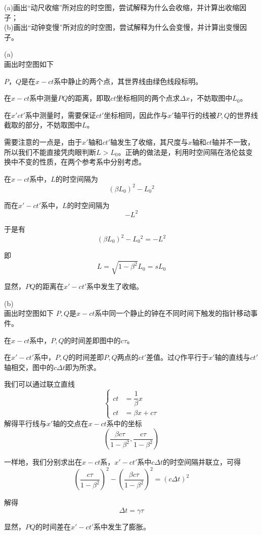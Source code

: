 \begin{ex}
(a)画出“动尺收缩”所对应的时空图，尝试解释为什么会收缩，并计算出收缩因子；
\\(b)画出“动钟变慢”所对应的时空图，尝试解释为什么会变慢，并计算出变慢因子。    
\end{ex}
\begin{so} 
    (a)\\
    画出时空图如下
    
    $P$，$Q$是在$x-ct$系中静止的两个点，其世界线由绿色线段标明。
    
    在$x-ct$系中测量$PQ$的距离，即取$ct$坐标相同的两个点求$\Delta x$，不妨取图中$L_0$。
    
    在$x'ct'$系中测量时，需要保证$ct'$坐标相同，因此作与$x'$轴平行的线被$P,Q$的世界线截取的部分，不妨取图中$L$。
    
    需要注意的一点是，由于$x'$轴和$ct'$轴发生了收缩，其尺度与$x$轴和$ct$轴并不一致，所以我们不能直接凭肉眼判断$L>L_0$。正确的做法是，利用时空间隔在洛伦兹变换中不变的性质，在两个参考系中分别考虑。
    
    在$x-ct$系中，$L$的时空间隔为\[(\beta L_0)^2-L_0{}^2\]
    
    而在$x'-ct'$系中，$L$的时空间隔为\[-L^2\]
    
    于是有\[(\beta L_0)^2-L_0{}^2=-L^2\]
    
    即\[L=\sqrt{1-\beta^2}L_0=sL_0\]
    
    显然，$PQ$的距离在$x'-ct'$系中发生了收缩。
    
	(b)\\
    画出时空图如下
    $P,Q$是$x-ct$系中同一个静止的钟在不同时间下触发的指针移动事件。
    
    在$x-ct$系中，$P,Q$的时间差即图中的$c\tau$。
    
    在$x'-ct'$系中，$P,Q$的时间差即$P,Q$两点的$ct'$差值。过$Q$作平行于$x'$轴的直线与$ct'$轴相交，图中的$c\Delta t$即为所求。
    
    我们可以通过联立直线
    \[\left\{
    	\begin{aligned}
    		ct &= \dfrac{1}{\beta} x\\
    		ct &= \beta x + c\tau
    	\end{aligned}
    \right.\]
    解得平行线与$x'$轴的交点在$x-ct$系中的坐标
    \[\left(\dfrac{\beta c\tau}{1-\beta^2},\dfrac{c\tau}{1-\beta^2}\right)\]
    
    一样地，我们分别求出在$x-ct$系，$x'-ct'$系中$c\Delta t$的时空间隔并联立，可得
    \[\left(\dfrac{c\tau}{1-\beta^2}\right)^2-\left(\dfrac{\beta c\tau}{1-\beta^2}\right)^2=(c\Delta t)^2\]
    
    解得
    \[\Delta t = \gamma \tau\]
    
    显然，$PQ$的时间差在$x'-ct'$系中发生了膨胀。   
\end{so}

